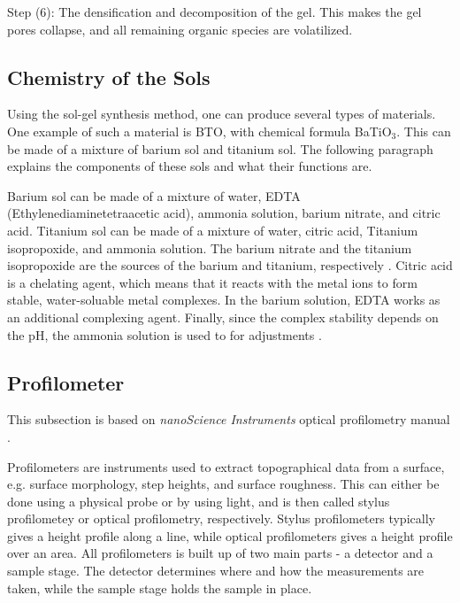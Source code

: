 Step (6): The densification and decomposition of the gel.
This makes the gel pores collapse, and all remaining organic species are volatilized.

\subsection{Chemistry of the Sols}

\noindent Using the sol-gel synthesis method, one can produce several types of materials.
One example of such a material is BTO, with chemical formula BaTiO$_3$.
This can be made of a mixture of barium sol and titanium sol.
The following paragraph explains the components of these sols and what their functions are.

Barium sol can be made of a mixture of water, EDTA (Ethylenediaminetetraacetic acid), ammonia solution, barium nitrate, and citric acid.
Titanium sol can be made of a mixture of water, citric acid, Titanium isopropoxide, and ammonia solution.
The barium nitrate and the titanium isopropoxide are the sources of the barium and titanium, respectively \cite{lab}. %
Citric acid is a chelating agent, which means that it reacts with the metal ions to form stable, water-soluable metal complexes.
In the barium solution, EDTA works as an additional complexing agent.
Finally, since the complex stability depends on the pH, the ammonia solution is used to for adjustments \cite{solgel_review}.

\subsection{Profilometer}

\noindent This subsection is based on \textit{nanoScience Instruments} optical profilometry manual \cite{profilometer_manual}.

Profilometers are instruments used to extract topographical data from a surface, e.g. surface morphology, step heights, and surface roughness.
This can either be done using a physical probe or by using light, and is then called stylus profilometey or optical profilometry, respectively.
Stylus profilometers typically gives a height profile along a line, while optical profilometers gives a height profile over an area.
All profilometers is built up of two main parts - a detector and a sample stage.
The detector determines where and how the measurements are taken, while the sample stage holds the sample in place.

